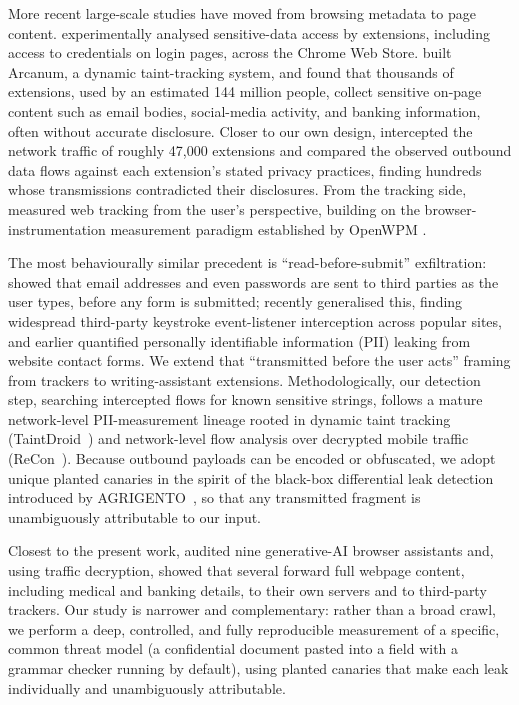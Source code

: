 \documentclass[10pt,conference,a4paper]{IEEEtran}
\begin{document}
More recent large-scale studies have moved from browsing metadata to page
content. \citet{nayak2024experimental} experimentally analysed sensitive-data access
by extensions, including access to credentials on login pages, across the Chrome Web
Store. \citet{xie2024arcanum} built Arcanum, a dynamic taint-tracking system, and
found that thousands of extensions, used by an estimated 144 million people, collect sensitive on-page content such as email bodies, social-media activity, and
banking information, often without accurate disclosure. Closer to our own design,
\citet{bui2023extpriva} intercepted the network traffic of roughly 47{,}000 extensions
and compared the observed outbound data flows against each extension's stated privacy
practices, finding hundreds whose transmissions contradicted their disclosures. From the
tracking side, \citet{dambra2022sally} measured web tracking from the user's perspective,
building on the browser-instrumentation measurement paradigm established by OpenWPM
\citep{englehardt2016openwpm}.

The most behaviourally similar precedent is ``read-before-submit'' exfiltration:
\citet{senol2022leakyforms} showed that email addresses and even passwords are sent to
third parties as the user types, before any form is submitted;
\citet{munir2025keystroke} recently generalised this, finding widespread third-party
keystroke event-listener interception across popular sites, and
\citet{starov2016contactforms} earlier quantified personally identifiable information (PII)
leaking from website contact forms.
We extend that ``transmitted before the user acts'' framing from trackers to
writing-assistant extensions. Methodologically, our detection step, searching
intercepted flows for known sensitive strings, follows a mature network-level
PII-measurement lineage rooted in dynamic taint tracking
(TaintDroid~\citep{enck2010taintdroid}) and network-level flow analysis over decrypted
mobile traffic (ReCon~\citep{ren2016recon}). Because outbound payloads can be encoded or
obfuscated, we adopt unique planted canaries in the spirit of the black-box
differential leak detection introduced by AGRIGENTO~\citep{continella2017agrigento},
so that any transmitted fragment is unambiguously attributable to our input.

Closest to the present work, \citet{vekaria2025bighelp} audited nine generative-AI
browser assistants and, using traffic decryption, showed that several forward full
webpage content, including medical and banking details, to their own servers and
to third-party trackers. Our study is narrower and complementary: rather than a
broad crawl, we perform a deep, controlled, and fully reproducible measurement
of a specific, common threat model (a confidential document pasted into a field with a
grammar checker running by default), using planted canaries that make
each leak individually and unambiguously attributable.
\end{document}

